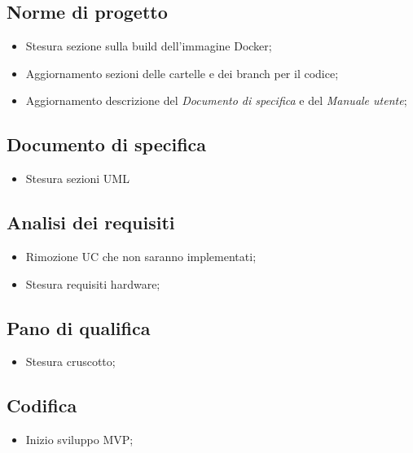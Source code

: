 \subsection{Norme di progetto}
\begin{itemize}
    \item Stesura sezione sulla build dell'immagine Docker;
    \item Aggiornamento sezioni delle cartelle e dei branch per il codice;
    \item Aggiornamento descrizione del \textit{Documento di specifica} e del \textit{Manuale utente};
\end{itemize}

\subsection{Documento di specifica}
\begin{itemize}
    \item Stesura sezioni UML
\end{itemize}

\subsection{Analisi dei requisiti}
\begin{itemize}
    \item Rimozione UC che non saranno implementati;
    \item Stesura requisiti hardware;
\end{itemize}

\subsection{Pano di qualifica}
\begin{itemize}
    \item Stesura cruscotto;
\end{itemize}

\subsection{Codifica}
\begin{itemize}
    \item Inizio sviluppo MVP;
\end{itemize}

